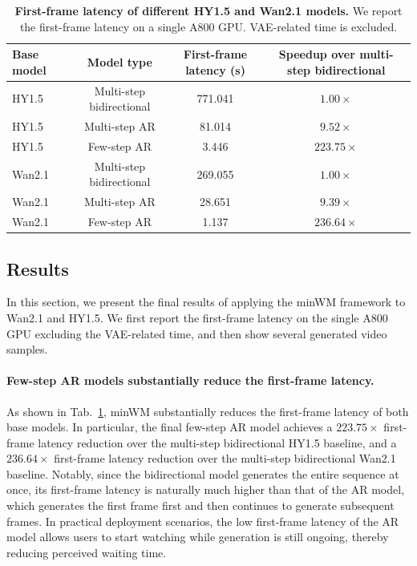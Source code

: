 \documentclass{llmxive}
\begin{document}
\begin{table}[t]
    \centering
    \begin{tabular}{lccc}
        \toprule
        Base model & Model type & First-frame latency (s) & Speedup over multi-step bidirectional \\
        \midrule
        HY1.5~\cite{kong2024hunyuanvideo} & Multi-step bidirectional & 771.041 & $1.00\times$ \\
        HY1.5 & Multi-step AR & 81.014 & $9.52\times$ \\
        HY1.5 & Few-step AR & 3.446 & $223.75\times$ \\
        \midrule
        Wan2.1 & Multi-step bidirectional & 269.055 & $1.00\times$ \\
        Wan2.1~\cite{wan2025wan} & Multi-step AR & 28.651 & $9.39\times$ \\
        Wan2.1 & Few-step AR & 1.137 & $236.64\times$ \\
        \bottomrule
    \end{tabular}
\caption{\textbf{First-frame latency of different HY1.5 and Wan2.1 models.} We report the first-frame latency on a single A800 GPU. VAE-related time is excluded.}
\label{tab:latency}
\end{table}


\subsection{Results}
In this section, we present the final results of applying the minWM framework to Wan2.1 and HY1.5. We first report the first-frame latency on the single A800 GPU excluding the VAE-related time, and then show several generated video samples.


\paragraph{Few-step AR models substantially reduce the first-frame latency.
} As shown in Tab.~\ref{tab:latency}, minWM substantially reduces the first-frame latency of both base models. In particular, the final few-step AR model achieves a $223.75\times$ first-frame latency reduction over the multi-step bidirectional HY1.5 baseline, and a $236.64\times$ first-frame latency reduction over the multi-step bidirectional Wan2.1 baseline. Notably, since the bidirectional model generates the entire sequence at once, its first-frame latency is naturally much higher than that of the AR model, which generates the first frame first and then continues to generate subsequent frames. In practical deployment scenarios, the low first-frame latency of the AR model allows users to start watching while generation is still ongoing, thereby reducing perceived waiting time.
\end{document}
